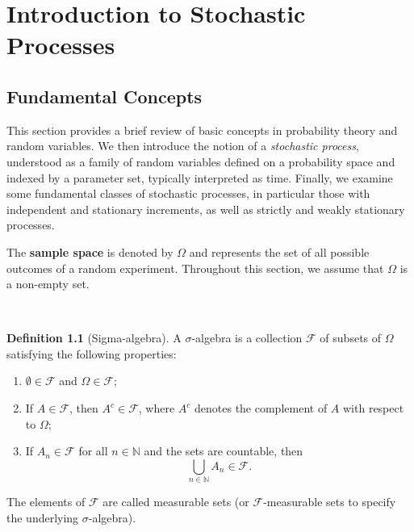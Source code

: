 \documentclass[
  11pt,
  a4paper,
]{book}
\theoremstyle{definition}
\newtheorem{definition}{Definition}[chapter]
\theoremstyle{definition}
\theoremstyle{definition}
\theoremstyle{definition}
\theoremstyle{remark}
\begin{document}
\chapter{Introduction to Stochastic Processes}\label{intro-stoch-proc}

\section{Fundamental Concepts}\label{conceitos-fundamentais}

This section provides a brief review of basic concepts in probability theory and random variables. We then introduce the notion of a \emph{stochastic process}, understood as a family of random variables defined on a probability space and indexed by a parameter set, typically interpreted as time. Finally, we examine some fundamental classes of stochastic processes, in particular those with independent and stationary increments, as well as strictly and weakly stationary processes.

The \textbf{sample space} is denoted by \(\Omega\) and represents the set of all possible outcomes of a random experiment. Throughout this section, we assume that \(\Omega\) is a non-empty set.

\(\,\)

\begin{definition}[Sigma-algebra]
A \(\sigma\)-algebra is a collection \(\mathcal{F}\) of subsets of \(\Omega\) satisfying the following properties:

\begin{enumerate}
\def\labelenumi{\arabic{enumi}.}
\item
  \(\emptyset \in \mathcal{F}\) and \(\Omega \in \mathcal{F}\);
\item
  If \(A \in \mathcal{F}\), then \(A^c \in \mathcal{F}\), where \(A^c\) denotes the complement of \(A\) with respect to \(\Omega\);
\item
  If \(A_n \in \mathcal{F}\) for all \(n \in \mathbb{N}\) and the sets are countable, then\\
  \[
  \bigcup_{n \in \mathbb{N}} A_n \in \mathcal{F}.
  \]
\end{enumerate}

The elements of \(\mathcal{F}\) are called measurable sets (or \(\mathcal{F}\)-measurable sets to specify the underlying \(\sigma\)-algebra).
\end{definition}

\(\,\)
\end{document}
